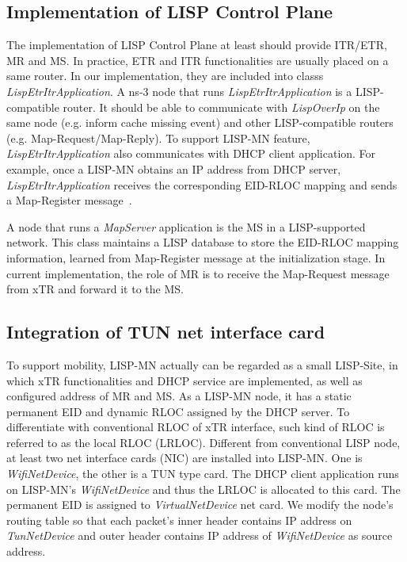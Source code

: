 \subsection{Implementation of LISP Control Plane}
\label{subsec:control-plane-impl}
The implementation of LISP Control Plane at least should provide ITR/ETR, MR and MS. In practice, ETR and ITR functionalities are usually placed on a same router. In our implementation, they are included into classs \emph{LispEtrItrApplication}. A ns-3 node that runs \emph{LispEtrItrApplication} is a LISP-compatible router. It should be able to communicate with \emph{LispOverIp} on the same node (e.g. inform cache missing event) and other LISP-compatible routers (e.g. Map-Request/Map-Reply). To support LISP-MN feature, \emph{LispEtrItrApplication} also communicates with DHCP client application. For example, once a LISP-MN obtains an IP address from DHCP server, \emph{LispEtrItrApplication} receives the corresponding EID-RLOC mapping and sends a Map-Register message~\cite{meyer-lisp-mn-16}.

A node that runs a \emph{MapServer} application is the MS in a LISP-supported network. This class maintains a LISP database to store the EID-RLOC mapping information, learned from Map-Register message at the initialization stage. In current implementation, the role of MR is to receive the Map-Request message from xTR and forward it to the MS.

\subsection{Integration of TUN net interface card}
\label{subsec:tundevice}
To support mobility, LISP-MN actually can be regarded as a small LISP-Site, in which xTR functionalities and DHCP service are implemented, as well as configured address of MR and MS. As a LISP-MN node, it has a static permanent EID and dynamic RLOC assigned by the DHCP server. To differentiate with conventional RLOC of xTR interface, such kind of RLOC is referred to as the local RLOC (LRLOC). Different from conventional LISP node, at least two net interface cards (NIC) are installed into LISP-MN. One is \emph{WifiNetDevice}, the other is a TUN type card. The DHCP client application runs on LISP-MN's \emph{WifiNetDevice} and thus the LRLOC is allocated to this card. The permanent EID is assigned to \emph{VirtualNetDevice} net card. We modify the node's routing table so that each packet's inner header contains IP address on \emph{TunNetDevice} and outer header contains IP address of \emph{WifiNetDevice} as source address.

